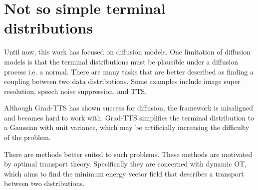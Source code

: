 \chapter{Not so simple terminal distributions}

Until now, this work has focused on diffusion models. One limitation of diffusion models is that the terminal distributions must be plausible under a diffusion process i.e. a normal. There are many tasks that are better described as finding a coupling between two data distributions. Some examples include image super resolution, speech noise suppression, and TTS.

Although Grad-TTS has shown success for diffusion, the framework is misaligned and becomes hard to work with. Grad-TTS simplifies the terminal distribution to a Gaussian with unit variance, which may be artificially increasing the difficulty of the problem. 

There are methods better suited to such problems. These methods are motivated by optimal transport theory. Specifically they are concerned with dynamic OT, which aims to find the minimum energy vector field that describes a transport between two distributions. 



